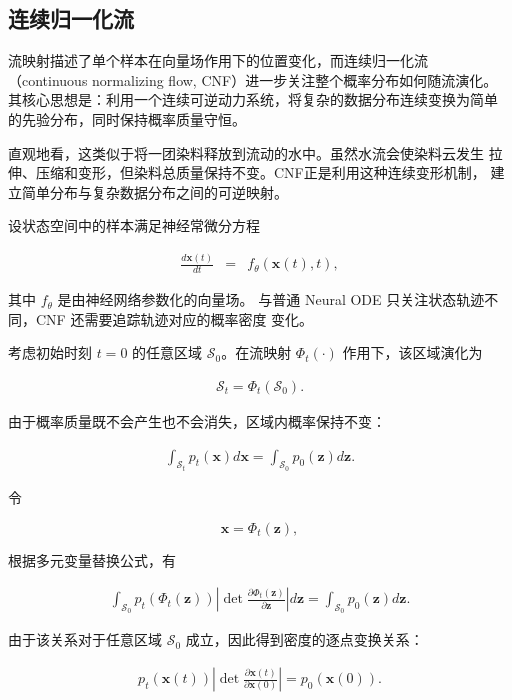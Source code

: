 \subsection{连续归一化流}
流映射描述了单个样本在向量场作用下的位置变化，而连续归一化流
（continuous normalizing flow, CNF）进一步关注整个概率分布如何随流演化。
其核心思想是：利用一个连续可逆动力系统，将复杂的数据分布连续变换为简单
的先验分布，同时保持概率质量守恒。

直观地看，这类似于将一团染料释放到流动的水中。虽然水流会使染料云发生
拉伸、压缩和变形，但染料总质量保持不变。CNF正是利用这种连续变形机制，
建立简单分布与复杂数据分布之间的可逆映射。

设状态空间中的样本满足神经常微分方程

\begin{eqnarray}
\frac{d\mathbf{x}(t)}{dt}
&=&
f_{\theta}(\mathbf{x}(t),t),
\label{eq:cnf-ode}
\end{eqnarray}

其中 $f_{\theta}$ 是由神经网络参数化的向量场。
与普通 Neural ODE 只关注状态轨迹不同，CNF 还需要追踪轨迹对应的概率密度
变化。

考虑初始时刻 $t=0$ 的任意区域 $\mathcal{S}_0$。在流映射
$\Phi_t(\cdot)$ 作用下，该区域演化为

\begin{eqnarray}
\mathcal{S}_t=\Phi_t(\mathcal{S}_0).
\end{eqnarray}

由于概率质量既不会产生也不会消失，区域内概率保持不变：

\begin{eqnarray}
\int_{\mathcal{S}_t}p_t(\mathbf{x})d\mathbf{x}
=
\int_{\mathcal{S}_0}p_0(\mathbf{z})d\mathbf{z}.
\end{eqnarray}

令

\[
\mathbf{x}=\Phi_t(\mathbf{z}),
\]

根据多元变量替换公式，有

\begin{eqnarray}
\int_{\mathcal{S}_0}
p_t(\Phi_t(\mathbf{z}))
\left|
\det
\frac{\partial\Phi_t(\mathbf{z})}{\partial\mathbf{z}}
\right|
d\mathbf{z}
=
\int_{\mathcal{S}_0}
p_0(\mathbf{z})d\mathbf{z}.
\end{eqnarray}

由于该关系对于任意区域 $\mathcal{S}_0$ 成立，因此得到密度的逐点变换关系：

\begin{eqnarray}
p_t(\mathbf{x}(t))
\left|
\det
\frac{\partial\mathbf{x}(t)}
{\partial\mathbf{x}(0)}
\right|
=
p_0(\mathbf{x}(0)).
\end{eqnarray}

